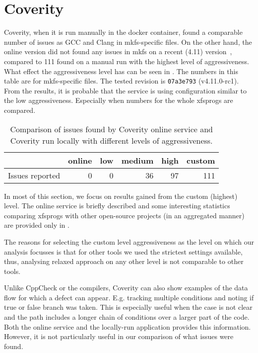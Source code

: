 \section{Coverity}\label{chap:results:coverity}

Coverity, when it is run manually in the docker container, found a comparable
number of issues as GCC and Clang in mkfs-specific files. On the other hand,
the online version did not found any issues in mkfs on a recent (4.11)
version~\cite{CoverityXfsprogs}, compared to 111 found on a manual run with the
highest level of aggressiveness. What effect the aggressiveness level has can
be seen in . The numbers in this table are
for mkfs-specific files. The tested revision is {\tt 07a3e793} (v4.11.0-rc1).
From the results, it is probable that the service is using configuration similar
to the low aggressiveness.  Especially when numbers for the whole xfsprogs are
compared.


\begin{table}[h]
\begin{tabular}{|l||r|r|r|r|r|}
\hline
& online & low & medium & high & custom \\
\hline
Issues reported & 0 & 0 & 36 & 97 & 111 \\
\hline
\end{tabular}
\caption{Comparison of issues found by Coverity online service and Coverity run
locally with different levels of aggressiveness.}
\label{tab:results:coverity:levels}
\end{table}

In most of this section, we focus on results gained from the custom (highest)
level. The online service is briefly described and some interesting statistics
comparing xfsprogs with other open-source projects (in an aggregated manner)
are provided only in .

The reasons for selecting the custom level aggressiveness as the level on which
our analysis focusses is that for other tools we used the strictest settings
available, thus, analysing relaxed approach on any other level is not
comparable to other tools.

Unlike CppCheck or the compilers, Coverity can also show examples of the data
flow for which a defect can appear.  E.g. tracking multiple conditions and
noting if true or false branch was taken. This is especially useful when the
case is not clear and the path includes a longer chain of conditions over a
larger part of the code. Both the online service and the locally-run
application provides this information. However, it is not particularly useful
in our comparison of what issues were found.

